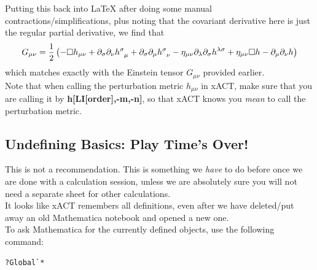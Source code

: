 \documentclass{book}
\theoremstyle{definition}
\newcommand{\p}{\partial}
\newcommand{\f}[2]{\frac{#1}{#2}}
\newcommand{\lp}{\left(}
\newcommand{\rp}{\right)}
\begin{document}
Putting this back into \LaTeX{} after doing some manual contractions/simplifications, plus noting that the covariant derivative here is just the regular partial derivative, we find that
\begin{align}\label{Gmunu}
G_{\mu\nu} = \f{1}{2}\lp -\square h_{\mu\nu} + \p_\sigma \p_\nu \tensor{h}{^\sigma_\mu}  
+ \p_\sigma \p_\mu \tensor{h}{^\sigma_\nu} 
- \eta_{\mu\nu}\p_\lambda \p_\sigma h^{\lambda\sigma} + \eta_{\mu\nu}\square h - \p_\mu\p_\nu h\rp
\end{align}
which matches exactly with the Einstein tensor $G_{\mu\nu}$ provided earlier.\\


Note that when calling the perturbation metric $h_{\mu\nu}$ in xACT, make sure that you are calling it by \textbf{h[LI[order],-m,-n]}, so that xACT knows you \textit{mean} to call the perturbation metric.


































\newpage



\subsection{Undefining Basics: Play Time's Over!}

This is not a recommendation. This is something we \textit{have} to do before once we are done with a calculation session, unless we are absolutely sure you will not need a separate sheet for other calculations. \\

It looks like xACT remembers all definitions, even after we have deleted/put away an old Mathematica notebook and opened a new one. \\

To ask Mathematica for the currently defined objects, use the following command:
\begin{lstlisting}
?Global`*
\end{lstlisting}
\end{document}
